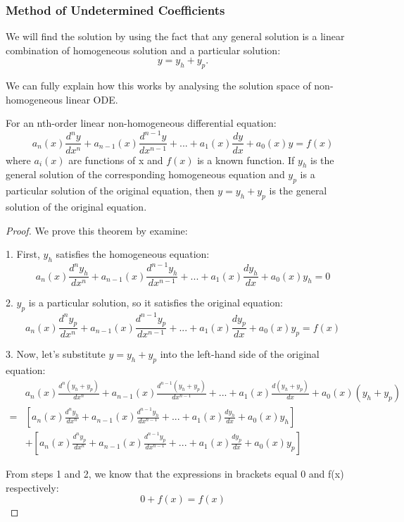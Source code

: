 \documentclass[12pt,a4paper]{article}
\begin{document}
\subsubsection*{Method of Undetermined Coefficients}
We will find the solution by using the fact that any general solution is a linear combination of homogeneous solution and a particular solution:
\begin{equation}\label{w8:homo}
y = y_h+y_p.
\end{equation}

\begin{remark}
We can fully explain how this works by analysing the solution space of non-homogeneous linear ODE.
\begin{theorem}
For an nth-order linear non-homogeneous differential equation:
\[a_n(x)\frac{d^ny}{dx^n} + a_{n-1}(x)\frac{d^{n-1}y}{dx^{n-1}} + ... + a_1(x)\frac{dy}{dx} + a_0(x)y = f(x)\]
where $a_i(x)$ are functions of x and $f(x)$ is a known function. If $y_h$ is the general solution of the corresponding homogeneous equation and $y_p$ is a particular solution of the original equation, then $y = y_h + y_p$ is the general solution of the original equation.
\end{theorem}

\begin{proof}
We prove this theorem by examine:

1. First, $y_h$ satisfies the homogeneous equation:
   \[a_n(x)\frac{d^ny_h}{dx^n} + a_{n-1}(x)\frac{d^{n-1}y_h}{dx^{n-1}} + ... + a_1(x)\frac{dy_h}{dx} + a_0(x)y_h = 0\]

2. $y_p$ is a particular solution, so it satisfies the original equation:
   \[a_n(x)\frac{d^ny_p}{dx^n} + a_{n-1}(x)\frac{d^{n-1}y_p}{dx^{n-1}} + ... + a_1(x)\frac{dy_p}{dx} + a_0(x)y_p = f(x)\]

3. Now, let's substitute $y = y_h + y_p$ into the left-hand side of the original equation:
   \begin{align*}
   &a_n(x)\frac{d^n(y_h + y_p)}{dx^n} + a_{n-1}(x)\frac{d^{n-1}(y_h + y_p)}{dx^{n-1}} + ... + a_1(x)\frac{d(y_h + y_p)}{dx} + a_0(x)(y_h + y_p) \\
   =&\left[a_n(x)\frac{d^ny_h}{dx^n} + a_{n-1}(x)\frac{d^{n-1}y_h}{dx^{n-1}} + ... + a_1(x)\frac{dy_h}{dx} + a_0(x)y_h\right] \\
   &+ \left[a_n(x)\frac{d^ny_p}{dx^n} + a_{n-1}(x)\frac{d^{n-1}y_p}{dx^{n-1}} + ... + a_1(x)\frac{dy_p}{dx} + a_0(x)y_p\right]
   \end{align*}

   From steps 1 and 2, we know that the expressions in brackets equal 0 and f(x) respectively:
   \[0 + f(x) = f(x)\]


\end{proof}
\end{remark}
\end{document}
